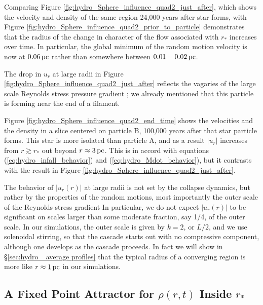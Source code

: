\documentclass[../dissertation.tex]{subfiles}
\begin{document}
Comparing Figure \ref{fig:hydro_Sphere_influence_quad2_just_after}, which shows 
the velocity and density of the same region 24,000 years after star 
\partA forms, with Figure \ref{fig:hydro_Sphere_influence_quad2_prior_to_particle} 
demonstrates that the radius of the change in character of the flow 
associated with $r_*$ increases over time. In particular, the global minimum 
of the random motion %
velocity is now at $0.06 \,\rm pc$ rather than somewhere 
between $0.01-0.02 \,\rm pc$.

The drop in $u_r$ at large radii in Figure 
\ref{fig:hydro_Sphere_influence_quad2_just_after} reflects the vagaries 
of the large scale Reynolds stress pressure gradient%
; we already mentioned that this particle is forming near the end of a filament.

Figure \ref{fig:hydro_Sphere_influence_quad2_end_time} shows the velocities and the density in a slice centered on particle B, 100,000 years after that star particle forms. 
This star is more isolated than particle A, and as a result $|u_r|$
increases from $r\gtrsim r_*$ out beyond $r\approx 3\,\rm pc$. This is in
accord with equations (\ref{eq:hydro_infall_behavior}) and (\ref{eq:hydro_Mdot_behavior}), but
it contrasts with the result in Figure \ref{fig:hydro_Sphere_influence_quad2_just_after}. 

The behavior of $|u_r(r)|$ at large radii is not set by the collapse dynamics, but rather by
the properties of the random motions, %
 most importantly the outer scale of the Reynolds stress gradient%
In particular, we do not expect $|u_r(r)|$ to be significant on scales larger than some moderate 
fraction, say 1/4, of the outer scale. In our simulations, the outer scale is given by $k=2$, 
or $L/2$, and we use solenoidal stirring, so that the cascade starts out with no compressive
component, although one develops as the cascade proceeds. In fact 
we will show in \S \ref{sec:hydro_ average profiles} that the typical radius of a converging region 
is more like $r\approx 1\,\rm pc$ in our simulations.

\subsection{A Fixed Point Attractor for $\rho(r, t)$ Inside $r_*$}\label{sec:hydro_attractor}
\end{document}
